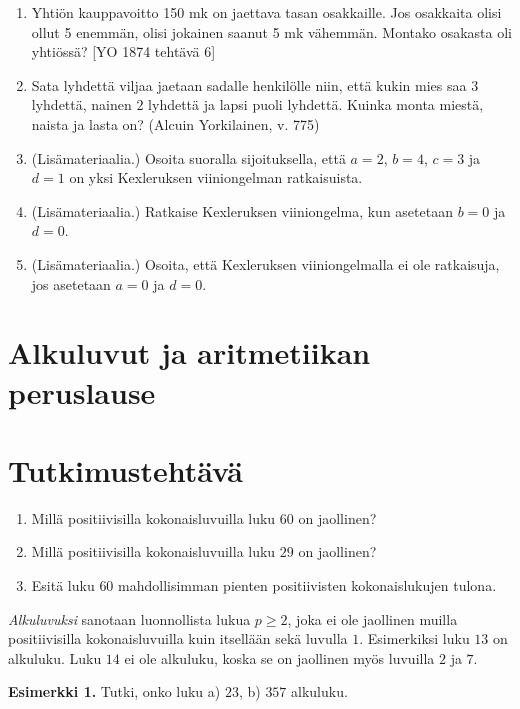 \begin{enumerate}
\item Yhtiön kauppavoitto 150 mk on jaettava tasan osakkaille. Jos osakkaita olisi ollut 5 enemmän, olisi jokainen saanut 5 mk vähemmän. Montako osakasta oli yhtiössä? 
[YO 1874 tehtävä 6]

\item Sata lyhdettä viljaa jaetaan sadalle henkilölle niin, että kukin mies saa $3$ lyhdettä, nainen $2$ lyhdettä ja lapsi puoli lyhdettä. Kuinka monta miestä, naista ja lasta on? (Alcuin Yorkilainen, v. 775)

\item (Lisämateriaalia.) Osoita suoralla sijoituksella, että $a=2$, $b=4$, $c=3$ ja $d=1$ on yksi Kexleruksen viiniongelman ratkaisuista.

\item (Lisämateriaalia.) Ratkaise Kexleruksen viiniongelma, kun asetetaan $b=0$ ja $d=0$.

\item (Lisämateriaalia.) Osoita, että Kexleruksen viiniongelmalla ei ole ratkaisuja, jos asetetaan $a=0$ ja $d=0$.

\end{enumerate}


\newpage


\section{Alkuluvut ja aritmetiikan peruslause}

\section*{Tutkimustehtävä}
\begin{enumerate}
\item Millä positiivisilla kokonaisluvuilla luku $60$ on jaollinen?
\item Millä positiivisilla kokonaisluvuilla luku $29$ on jaollinen?
\item Esitä luku $60$ mahdollisimman pienten positiivisten kokonaislukujen tulona.
\end{enumerate}

{\em Alkuluvuksi} sanotaan luonnollista lukua $p\ge 2$, joka ei ole jaollinen muilla positiivisilla kokonaisluvuilla kuin itsellään sekä luvulla $1$. Esimerkiksi luku $13$ on alkuluku. Luku $14$ ei ole alkuluku, koska se on jaollinen myös luvuilla $2$ ja $7$.


{\bf Esimerkki 1.} Tutki, onko luku a) $23$, b) $357$ alkuluku.

